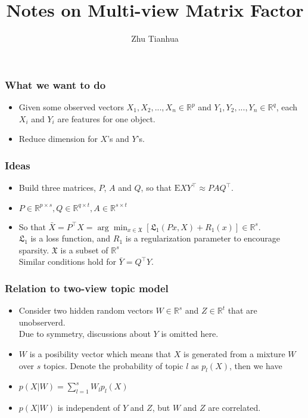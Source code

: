 \documentclass{beamer}
\begin{document}
\title[Notes on Multi-view Matrix Factor]{Notes on Multi-view Matrix Factor}
\author{Zhu Tianhua}
\frame{\titlepage}

\begin{frame}
\frametitle{What we want to do}
\begin{itemize}
\item Given some observed vectors $X_1, X_2, ..., X_n \in \mathbb{R}^p$ and $Y_1, Y_2, ..., Y_n \in \mathbb{R}^q$, each $X_i$ and $Y_i$ are features for one object.
\item Reduce dimension for $X$'s and $Y$'s.
\end{itemize}
\end{frame}

\begin{frame}
\frametitle{Ideas}
\begin{itemize}
\item Build three matrices, $P$, $A$ and $Q$, so that $\text{E}XY^\top \approx PAQ^\top$.
\item $P \in \mathbb{R}^{p \times s}, Q \in \mathbb{R}^{q \times t}, A \in \mathbb{R}^{s \times t}$
\item So that $\bar{X} = P^\top X = \arg \min_{x \in \mathfrak{X}}{[\mathfrak{L}_1(Px, X) + R_1(x)] \in \mathbb{R}^s}$. \\
	$\mathfrak{L}_1$ is a loss function, and $R_1$ is a regularization parameter to encourage sparsity. $\mathfrak{X}$ is a subset of $\mathbb{R}^s$ \\
	Similar conditions hold for $\bar{Y} = Q^\top Y$.
\end{itemize}
\end{frame}

\begin{frame}
\frametitle{Relation to two-view topic model}
\begin{itemize}
\item Consider two hidden random vectors $W \in \mathbb{R}^s$ and $Z \in \mathbb{R}^t$ that are unobserverd. \\
	Due to symmetry, discussions about $Y$ is omitted here.
\item $W$ is a posibility vector which means that $X$ is generated from a mixture $W$ over $s$ topics. Denote the probability of topic $l$ as $p_l(X)$, then we have
\item $p(X|W) = \sum_{l=1}^s{W_lp_l(X)}$
\item $p(X|W)$ is independent of $Y$ and $Z$, but $W$ and $Z$ are correlated.
\end{itemize}
\end{frame}
\end{document}
